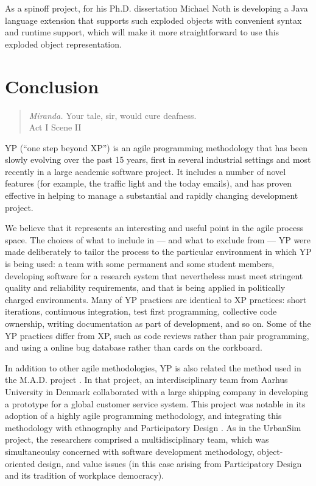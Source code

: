 \documentclass[times, 10pt,twocolumn]{article}
\begin{document}
As a spinoff project, for his Ph.D. dissertation Michael Noth is developing
a Java language extension that supports such exploded objects with
convenient syntax and runtime support, which will make it more
straightforward to use this exploded object representation.

\section{Conclusion}

\begin{quote}
\emph{Miranda.} Your tale, sir, would cure deafness. \\
\hspace*{1cm} Act I Scene II
\end{quote}

YP (``one step beyond XP'') is an agile programming methodology that has
been slowly evolving over the past 15 years, first in several industrial
settings and most recently in a large academic software project.  It
includes a number of novel features (for example, the traffic light and the
today emails), and has proven effective in helping to manage a substantial
and rapidly changing development project.

We believe that it represents an interesting and useful point in the agile
process space.  The choices of what to include in --- and what to exclude
from --- YP were made deliberately to tailor the process to the particular
environment in which YP is being used: a team with some permanent and some
student members, developing software for a research system that
nevertheless must meet stringent quality and reliability requirements, and
that is being applied in politically charged environments.  Many of YP
practices are identical to XP practices: short iterations, continuous
integration, test first programming, collective code ownership, writing
documentation as part of development, and so on.  Some of the YP practices
differ from XP, such as code reviews rather than pair programming, and
using a online bug database rather than cards on the corkboard.

In addition to other agile methodologies, YP is also related the method used
in the M.A.D. project \cite{christensen-ecoop-1998}.
In that project, an interdisciplinary
team from Aarhus University in Denmark collaborated with a large shipping
company in developing a prototype for a global customer service system.
This project was notable in its adoption of a highly agile programming
methodology, and integrating this methodology with ethnography and
Participatory Design \cite{bjerknes-book-1987,greenbaum-pd-1991}.  As in
the UrbanSim project, the researchers comprised a multidisciplinary team,
which was simultaneoulsy concerned with software development methodology,
object-oriented design, and value issues (in this case arising from
Participatory Design and its tradition of workplace democracy).
\end{document}
